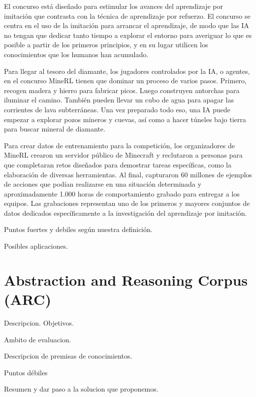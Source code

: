 El concurso está diseñado para estimular los avances del aprendizaje por imitación que contrasta con la técnica de aprendizaje por refuerzo. El concurso se centra en el uso de la imitación para arrancar el aprendizaje, de modo que las IA no tengan que dedicar tanto tiempo a explorar el entorno para averiguar lo que es posible a partir de los primeros principios, y en su lugar utilicen los conocimientos que los humanos han acumulado. 

Para llegar al tesoro del diamante, los jugadores controlados por la IA, o agentes, en el concurso MineRL tienen que dominar un proceso de varios pasos. Primero, recogen madera y hierro para fabricar picos. Luego construyen antorchas para iluminar el camino. También pueden llevar un cubo de agua para apagar las corrientes de lava subterráneas. Una vez preparado todo eso, una IA puede empezar a explorar pozos mineros y cuevas, así como a hacer túneles bajo tierra para buscar mineral de diamante.

Para crear datos de entrenamiento para la competición, los organizadores de MineRL crearon un servidor público de Minecraft y reclutaron a personas para que completaran retos diseñados para demostrar tareas específicas, como la elaboración de diversas herramientas. Al final, capturaron 60 millones de ejemplos de acciones que podían realizarse en una situación determinada y aproximadamente 1.000 horas de comportamiento grabado para entregar a los equipos. Las grabaciones representan uno de los primeros y mayores conjuntos de datos dedicados específicamente a la investigación del aprendizaje por imitación.

Puntos fuertes y debiles según nuestra definición.

Posibles aplicaciones.

\section{Abstraction and Reasoning Corpus (ARC)}\label{section:state-of-the-art:arc}

Descripcion. Objetivos.

Ambito de evaluacion.

Descripcion de premisas de conocimientos.

Puntos débiles

Resumen y dar paso a la solucion que proponemos.
